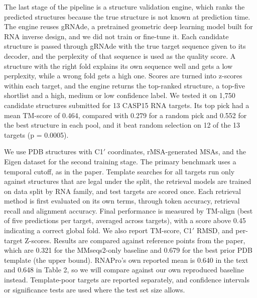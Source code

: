 \documentclass{FastFyp}
\begin{document}
The last stage of the pipeline is a structure validation engine, which ranks the predicted structures because the true structure is not known at prediction time. The engine reuses gRNAde, a pretrained geometric deep learning model built for RNA inverse design, and we did not train or fine-tune it. Each candidate structure is passed through gRNAde with the true target sequence given to its decoder, and the perplexity of that sequence is used as the quality score. A structure with the right fold explains its own sequence well and gets a low perplexity, while a wrong fold gets a high one. Scores are turned into z-scores within each target, and the engine returns the top-ranked structure, a top-five shortlist and a high, medium or low confidence label. We tested it on 1,750 candidate structures submitted for 13 CASP15 RNA targets. Its top pick had a mean TM-score of 0.464, compared with 0.279 for a random pick and 0.552 for the best structure in each pool, and it beat random selection on 12 of the 13 targets (p = 0.0005).

We use PDB structures with C1$'$ coordinates, rMSA-generated MSAs, and the Eigen dataset for the second training stage. The primary benchmark uses a temporal cutoff, as in the paper. Template searches for all targets run only against structures that are legal under the split, the retrieval models are trained on data split by RNA family, and test targets are scored once. Each retrieval method is first evaluated on its own terms, through token accuracy, retrieval recall and alignment accuracy. Final performance is measured by TM-align (best of five predictions per target, averaged across targets), with a score above 0.45 indicating a correct global fold. We also report TM-score, C1$'$ RMSD, and per-target Z-scores. Results are compared against reference points from the paper, which are 0.321 for the MMseqs2-only baseline and 0.679 for the best prior PDB template (the upper bound). RNAPro's own reported mean is 0.640 in the text and 0.648 in Table 2, so we will compare against our own reproduced baseline instead. Template-poor targets are reported separately, and confidence intervals or significance tests are used where the test set size allows.
\end{document}
